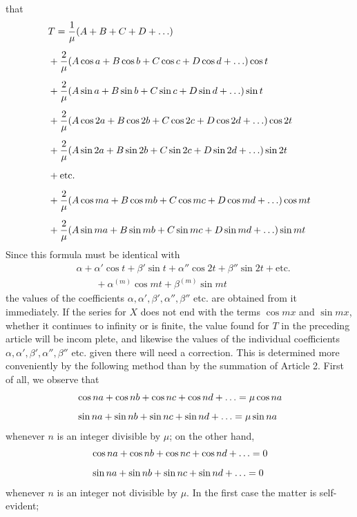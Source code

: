 that
\[
\begin{aligned}
&T=\frac{1}{\mu}(A+B+C+D+\mathinner{.\,.\,.})\\[5pt]
&+\frac{2}{\mu}(A\cos a+B\cos b+C\cos c+D\cos d+\mathinner{.\,.\,.})\cos t\\[5pt]
&+\frac{2}{\mu}(A\sin a+B\sin b+C\sin c+D\sin d+\mathinner{.\,.\,.})\sin t\\[5pt]
&+\frac{2}{\mu}(A\cos2a+B\cos2b+C\cos2c+D\cos2d+\mathinner{.\,.\,.})\cos2t\\[5pt]
&+\frac{2}{\mu}(A\sin2a+B\sin2b+C\sin2c+D\sin2d+\mathinner{.\,.\,.})\sin2t\\[5pt]
&+\mathrm{etc.}\\[5pt]
&+\frac{2}{\mu}(A\cos ma+B\cos mb+C\cos mc+D\cos md+\mathinner{.\,.\,.})\cos mt\\[5pt]
&+\frac{2}{\mu}(A\sin ma+B\sin mb+C\sin mc+D\sin md+\mathinner{.\,.\,.})\sin mt
\end{aligned}
\]
Since this formula must be identical with
\[
\begin{aligned}
&\alpha+\alpha'\cos t+\beta'\sin t+\alpha''\cos2t+\beta''\sin2t+\mathrm{etc.}\\[5pt]&\qquad{}+\alpha^{(m)}\cos mt+\beta^{(m)}\sin mt
\end{aligned}
\]
the values of the coefficients \(\alpha,\alpha',\beta',\alpha'',\beta''\) etc. are obtained from it
immediately.
If the series for \(X\) does not end with the terms \(\cos mx\) and \(\sin mx\), whether
it continues to infinity or is finite, the value found for \(T\) in the preceding article will be incom%
plete, and likewise the values of the individual coefficients \(\alpha,\alpha',\beta',\alpha'',\beta''\) etc. given there
will need a correction. This is determined more conveniently by the following method than by the summation of Article 2. First of all, we observe that
\[
\begin{aligned}
&\cos na+\cos nb+\cos nc+\cos nd+\mathinner{.\,.\,.}=\mu\cos na\\[5pt]
&\sin na+\sin nb+\sin nc+\sin nd+\mathinner{.\,.\,.}=\mu\sin na
\end{aligned}
\]
whenever \(n\) is an integer divisible by \(\mu\); on the other hand,
\[
\begin{aligned}
&\cos na+\cos nb+\cos nc+\cos nd+\mathinner{.\,.\,.}=0\\[5pt]
&\sin na+\sin nb+\sin nc+\sin nd+\mathinner{.\,.\,.}=0
\end{aligned}
\]
whenever \(n\) is an integer not divisible by \(\mu\). In the first case the matter is self-evident;
